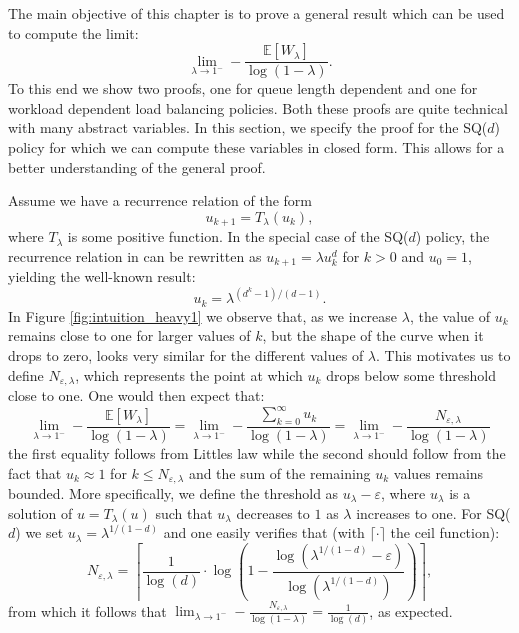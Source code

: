 \documentclass[12pt]{report}
\newcommand{\E}{\mathbb{E}}
\begin{document}
The main objective of this chapter is to prove a general result which can be used to compute the limit:
$$
\lim_{\lambda \rightarrow 1^-} -\frac{\E[W_\lambda]}{\log(1-\lambda)}.
$$
To this end we show two proofs, one for queue length dependent and one for workload dependent load balancing policies. Both these proofs are quite technical with many abstract variables. In this section, we specify the proof for the SQ($d$) policy for which we can compute these variables in closed form. This allows for a better understanding of the general proof.

Assume we have a recurrence relation of the form 
$$
u_{k+1} = T_\lambda(u_k),
$$
where
$T_\lambda$ is some positive function. 
In the special case of the SQ($d$) policy,  the
recurrence relation in \cite{mitzenmacher1} can be 
rewritten as $u_{k+1} = \lambda u_{k}^d$ for $k >0$ and $u_0 = 1$, yielding
the well-known result:
$$
u_k = \lambda^{(d^k-1)/(d-1)}.
$$
In Figure \ref{fig:intuition_heavy1} we observe that, as we increase $\lambda$,  the value of $u_k$ remains close to one for larger values of $k$, but the shape of the curve when it drops to
zero, looks very similar for the different values of $\lambda$. This motivates us to define $N_{\varepsilon, \lambda}$, which represents the point at which $u_k$ drops below some threshold 
close to one.
One would then expect that:
$$
\lim_{\lambda \rightarrow 1^-} -\frac{\E[W_\lambda]}{\log(1-\lambda)}
=
\lim_{\lambda \rightarrow 1^-} -\frac{\sum_{k=0}^\infty u_k}{\log(1-\lambda)}=\lim_{\lambda \rightarrow 1^-} -\frac{N_{\varepsilon, \lambda}}{\log(1-\lambda)}
$$
the first equality follows from Littles law while the second should follow from the fact that $u_k \approx 1$ for $k \leq N_{\varepsilon, \lambda}$ and the sum of the remaining
$u_k$ values remains bounded.  More specifically, we define the threshold as $u_\lambda-\varepsilon$, where $u_\lambda$ is a solution of $u=T_\lambda(u)$ such that $u_\lambda$
decreases to $1$ as $\lambda$ increases to one. For SQ($d$) we set $u_\lambda = \lambda^{1/(1-d)}$
and one easily verifies that (with $\lceil \cdot \rceil$ the ceil function):
$$
N_{\varepsilon, \lambda}
=
\left \lceil \frac{1}{\log(d)} \cdot \log\left( 1-\frac{\log(\lambda^{1/(1-d)}-\varepsilon)}{\log(\lambda^{1/(1-d)})} \right)
\right \rceil,
$$
from which it follows that $\lim_{\lambda \rightarrow 1^-} -\frac{N_{\varepsilon, \lambda}}{\log(1-\lambda)}=\frac{1}{\log(d)}$, as expected. 
\end{document}
